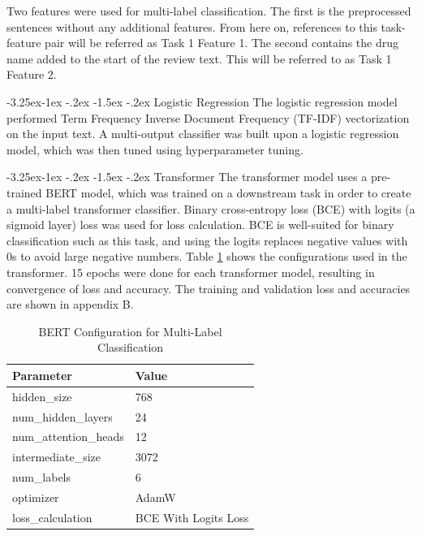 \documentclass[10.7pt, onecolumn]{article}
\makeatletter
\renewcommand\subsubsection{\@startsection{subsubsection}{3}{\z@}%
	{-3.25ex\@plus -1ex \@minus -.2ex}%
    {-1.5ex \@plus -.2ex}%
    {\normalfont\itshape}}
\makeatother
\begin{document}
Two features were used for multi-label classification. The first is the preprocessed sentences without any additional features. From here on, references to this task-feature pair will be referred as Task 1 Feature 1. The second contains the drug name added to the start of the review text. This will be referred to as Task 1 Feature 2.

\subsubsection{Logistic Regression}
The logistic regression model performed Term Frequency Inverse Document Frequency (TF-IDF) vectorization on the input text. A multi-output classifier was built upon a logistic regression model, which was then tuned using hyperparameter tuning.

\subsubsection{Transformer}
The transformer model uses a pre-trained BERT model, which was trained on a downstream task in order to create a multi-label transformer classifier. Binary cross-entropy loss (BCE) with logits (a sigmoid layer) loss was used for loss calculation. BCE is well-suited for binary classification\cite{xu2023learning} such as this task, and using the logits replaces negative values with 0s to avoid large negative numbers. Table \ref{tab:task1Parameters} shows the configurations used in the transformer. 15 epochs were done for each transformer model, resulting in convergence of loss and accuracy. The training and validation loss and accuracies are shown in appendix B.

\begin{table}[H]
  \centering
  \begin{tabular}{|p{4cm}|p{4cm}|}
    \hline
    \textbf{Parameter} & \textbf{Value} \\
    \hline
    hidden\_size & 768 \\
    \hline
    num\_hidden\_layers & 24 \\
    \hline
    num\_attention\_heads & 12 \\
    \hline
    intermediate\_size & 3072 \\
    \hline
    num\_labels & 6 \\
    \hline
    optimizer & AdamW \\
    \hline
    loss\_calculation & BCE With Logits Loss \\ 
    \hline
  \end{tabular}
  \caption{BERT Configuration for Multi-Label Classification}
  \label{tab:task1Parameters}
\end{table}
\end{document}
